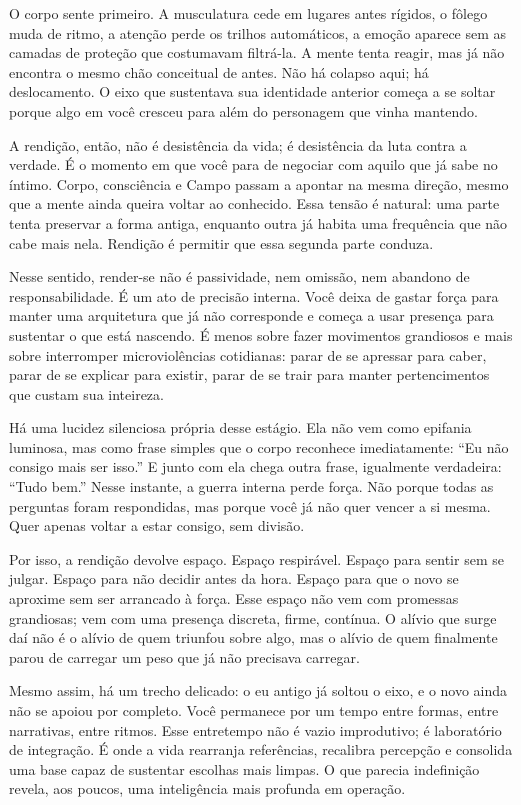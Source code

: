 \documentclass[12pt]{book}
\begin{document}
O corpo sente primeiro. A musculatura cede em lugares antes rígidos, o fôlego muda de ritmo, a atenção perde os trilhos automáticos, a emoção aparece sem as camadas de proteção que costumavam filtrá-la. A mente tenta reagir, mas já não encontra o mesmo chão conceitual de antes. Não há colapso aqui; há deslocamento. O eixo que sustentava sua identidade anterior começa a se soltar porque algo em você cresceu para além do personagem que vinha mantendo.

A rendição, então, não é desistência da vida; é desistência da luta contra a verdade. É o momento em que você para de negociar com aquilo que já sabe no íntimo. Corpo, consciência e Campo passam a apontar na mesma direção, mesmo que a mente ainda queira voltar ao conhecido. Essa tensão é natural: uma parte tenta preservar a forma antiga, enquanto outra já habita uma frequência que não cabe mais nela. Rendição é permitir que essa segunda parte conduza.

Nesse sentido, render-se não é passividade, nem omissão, nem abandono de responsabilidade. É um ato de precisão interna. Você deixa de gastar força para manter uma arquitetura que já não corresponde e começa a usar presença para sustentar o que está nascendo. É menos sobre fazer movimentos grandiosos e mais sobre interromper microviolências cotidianas: parar de se apressar para caber, parar de se explicar para existir, parar de se trair para manter pertencimentos que custam sua inteireza.

Há uma lucidez silenciosa própria desse estágio. Ela não vem como epifania luminosa, mas como frase simples que o corpo reconhece imediatamente: “Eu não consigo mais ser isso.” E junto com ela chega outra frase, igualmente verdadeira: “Tudo bem.” Nesse instante, a guerra interna perde força. Não porque todas as perguntas foram respondidas, mas porque você já não quer vencer a si mesma. Quer apenas voltar a estar consigo, sem divisão.

Por isso, a rendição devolve espaço. Espaço respirável. Espaço para sentir sem se julgar. Espaço para não decidir antes da hora. Espaço para que o novo se aproxime sem ser arrancado à força. Esse espaço não vem com promessas grandiosas; vem com uma presença discreta, firme, contínua. O alívio que surge daí não é o alívio de quem triunfou sobre algo, mas o alívio de quem finalmente parou de carregar um peso que já não precisava carregar.

Mesmo assim, há um trecho delicado: o eu antigo já soltou o eixo, e o novo ainda não se apoiou por completo. Você permanece por um tempo entre formas, entre narrativas, entre ritmos. Esse entretempo não é vazio improdutivo; é laboratório de integração. É onde a vida rearranja referências, recalibra percepção e consolida uma base capaz de sustentar escolhas mais limpas. O que parecia indefinição revela, aos poucos, uma inteligência mais profunda em operação.
\end{document}
